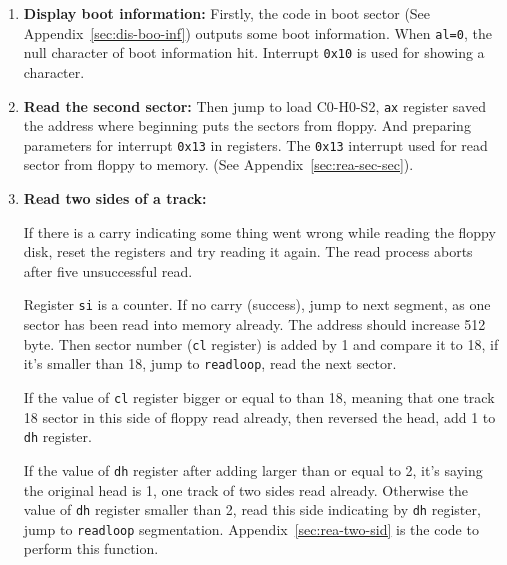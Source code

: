 \documentclass{swfcthesis}
\begin{document}
\begin{enumerate}
\item \textbf{Display boot information:} Firstly, the code in boot sector (See
  Appendix~\ref{sec:dis-boo-inf}) outputs some boot information. When \texttt{al=0}, the
  null character of boot information hit. Interrupt \texttt{0x10} is used for showing a
  character.
\item \textbf{Read the second sector:} Then jump to load C0-H0-S2, \texttt{ax} register
  saved the address where beginning puts the sectors from floppy. And preparing parameters
  for interrupt \texttt{0x13} in registers. The \texttt{0x13} interrupt used for read
  sector from floppy to memory. (See Appendix~\ref{sec:rea-sec-sec}).
\item \textbf{Read two sides of a track:}
  
  If there is a carry indicating some thing went wrong while reading the floppy disk,
  reset the registers and try reading it again. The read process aborts after five
  unsuccessful read.

  Register \texttt{si} is a counter. If no carry (success), jump to next segment, as one
  sector has been read into memory already. The address should increase 512 byte. Then
  sector number (\texttt{cl} register) is added by 1 and compare it to 18, if it's smaller
  than 18, jump to \texttt{readloop}, read the next sector.

  If the value of \texttt{cl} register bigger or equal to than 18, meaning that one track
  18 sector in this side of floppy read already, then reversed the head, add 1 to
  \texttt{dh} register.

  If the value of \texttt{dh} register after adding larger than or equal to 2, it's saying
  the original head is 1, one track of two sides read already. Otherwise the value of
  \texttt{dh} register smaller than 2, read this side indicating by \texttt{dh} register,
  jump to \texttt{readloop} segmentation. Appendix~\ref{sec:rea-two-sid} is the code to
  perform this function.


\end{enumerate}
\end{document}
